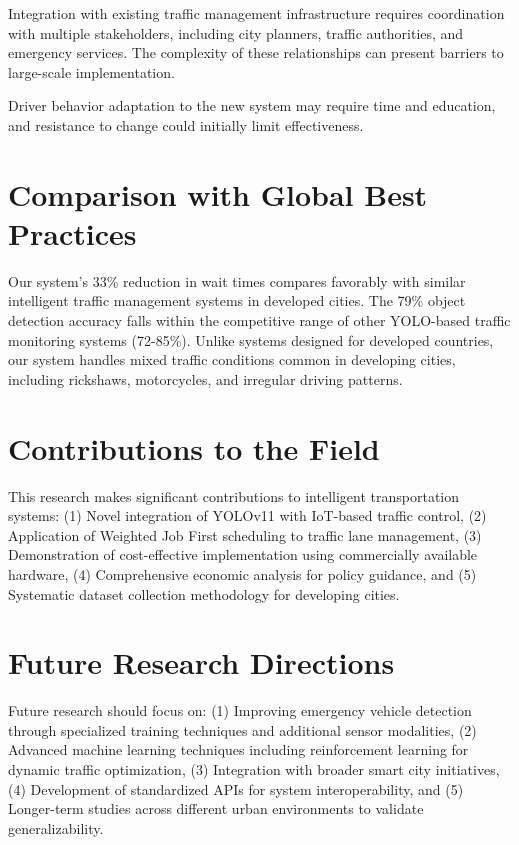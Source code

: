 Integration with existing traffic management infrastructure requires coordination with multiple stakeholders, including city planners, traffic authorities, and emergency services. The complexity of these relationships can present barriers to large-scale implementation.

Driver behavior adaptation to the new system may require time and education, and resistance to change could initially limit effectiveness.

\section{Comparison with Global Best Practices}
\label{sec:global_comparison}

Our system's 33\% reduction in wait times compares favorably with similar intelligent traffic management systems in developed cities. The 79\% object detection accuracy falls within the competitive range of other YOLO-based traffic monitoring systems (72-85\%). Unlike systems designed for developed countries, our system handles mixed traffic conditions common in developing cities, including rickshaws, motorcycles, and irregular driving patterns.

\section{Contributions to the Field}
\label{sec:contributions}

This research makes significant contributions to intelligent transportation systems: (1) Novel integration of YOLOv11 with IoT-based traffic control, (2) Application of Weighted Job First scheduling to traffic lane management, (3) Demonstration of cost-effective implementation using commercially available hardware, (4) Comprehensive economic analysis for policy guidance, and (5) Systematic dataset collection methodology for developing cities.

\section{Future Research Directions}
\label{sec:future_research}

Future research should focus on: (1) Improving emergency vehicle detection through specialized training techniques and additional sensor modalities, (2) Advanced machine learning techniques including reinforcement learning for dynamic traffic optimization, (3) Integration with broader smart city initiatives, (4) Development of standardized APIs for system interoperability, and (5) Longer-term studies across different urban environments to validate generalizability.

